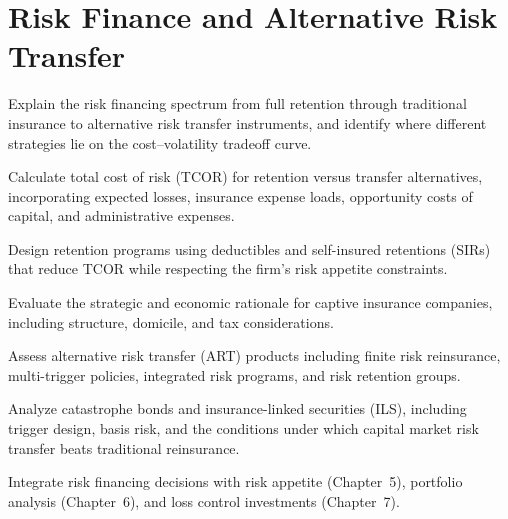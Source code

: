 \documentclass[11pt,openany]{book}
\begin{document}
\setcounter{chapter}{7}
\chapter{Risk Finance and Alternative Risk Transfer}
\label{chap:risk-finance}

\begin{learningobjectives}
  \item Explain the risk financing spectrum from full retention through
        traditional insurance to alternative risk transfer instruments, and
        identify where different strategies lie on the cost--volatility
        tradeoff curve.
  \item Calculate total cost of risk (TCOR) for retention versus transfer
        alternatives, incorporating expected losses, insurance expense loads,
        opportunity costs of capital, and administrative expenses.
  \item Design retention programs using deductibles and self-insured
        retentions (SIRs) that reduce TCOR while respecting the firm's risk
        appetite constraints.
  \item Evaluate the strategic and economic rationale for captive insurance
        companies, including structure, domicile, and tax considerations.
  \item Assess alternative risk transfer (ART) products including finite risk
        reinsurance, multi-trigger policies, integrated risk programs, and
        risk retention groups.
  \item Analyze catastrophe bonds and insurance-linked securities (ILS),
        including trigger design, basis risk, and the conditions under which
        capital market risk transfer beats traditional reinsurance.
  \item Integrate risk financing decisions with risk appetite
        (Chapter~5), portfolio analysis
        (Chapter~6), and loss control investments
        (Chapter~7).
\end{learningobjectives}
\end{document}
